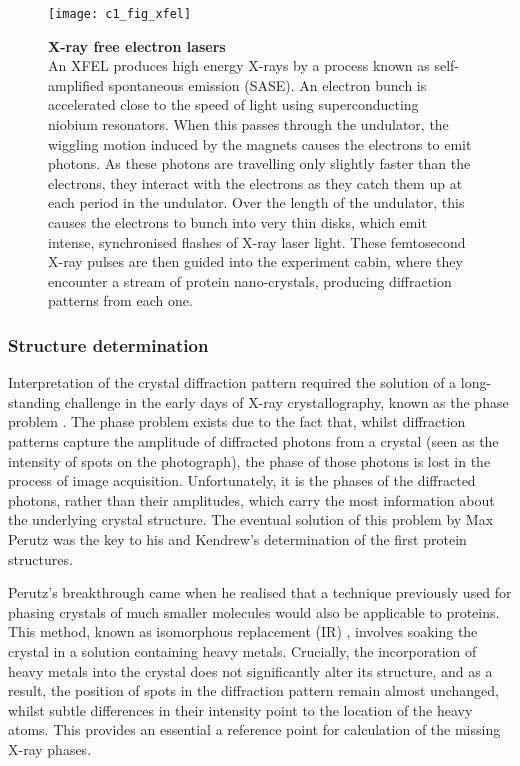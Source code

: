 \documentclass[a4paper,11pt,twoside,openright]{scrbook}
\begin{document}
\begin{figure}[h]
    \texttt{[image: c1\_fig\_xfel]}
    \caption[X-ray free electron lasers]{\sffamily \textbf{X-ray free electron lasers} \\ \small An XFEL produces high energy X-rays by a process known as self-amplified spontaneous emission (SASE). An electron bunch is accelerated close to the speed of light using superconducting niobium resonators. When this passes through the undulator, the wiggling motion induced by the magnets causes the electrons to emit photons. As these photons are travelling only slightly faster than the electrons, they interact with the electrons as they catch them up at each period in the undulator. Over the length of the undulator, this causes the electrons to bunch into very thin disks, which emit intense, synchronised flashes of X-ray laser light. These femtosecond X-ray pulses are then guided into the experiment cabin, where they encounter a stream of protein nano-crystals, producing diffraction patterns from each one.}
    \label{figure:xfels}
\end{figure}

\subsubsection{Structure determination}
Interpretation of the crystal diffraction pattern required the solution of a long-standing challenge in the early days of X-ray crystallography, known as the phase problem \cite{Taylor2003}. The phase problem exists due to the fact that, whilst diffraction patterns capture the amplitude of diffracted photons from a crystal (seen as the intensity of spots on the photograph), the phase of those photons is lost in the process of image acquisition. Unfortunately, it is the phases of the diffracted photons, rather than their amplitudes, which carry the most information about the underlying crystal structure. The eventual solution of this problem by Max Perutz was the key to his and Kendrew's determination of the first protein structures.

Perutz's breakthrough came when he realised that a technique previously used for phasing crystals of much smaller molecules would also be applicable to proteins. This method, known as isomorphous replacement (IR)  \cite{Robertson1936}, involves soaking the crystal in a solution containing heavy metals. Crucially, the incorporation of heavy metals into the crystal does not significantly alter its structure, and as a result, the position of spots in the diffraction pattern remain almost unchanged, whilst subtle differences in their intensity point to the location of the heavy atoms. This provides an essential a reference point for calculation of the missing X-ray phases.
\end{document}
